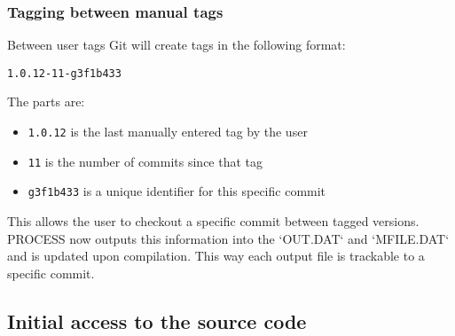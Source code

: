 \documentclass[11pt,a4paper]{report}
\begin{document}
\subsubsection{Tagging between manual tags}
Between user tags Git will create tags in the following format:

\texttt{1.0.12-11-g3f1b433}

The parts are:
\begin{itemize}
  \item \texttt{1.0.12} is the last manually entered tag by the user
  \item \texttt{11} is the number of commits since that tag
  \item \texttt{g3f1b433} is a unique identifier for this specific commit
\end{itemize}

This allows the user to checkout a specific commit between tagged versions.
PROCESS now outputs this information into the `OUT.DAT` and `MFILE.DAT` and is
updated upon compilation. This way each output file is trackable to a specific commit.


\subsection{Initial access to the source code}
\label{sec:getsource}
\end{document}
